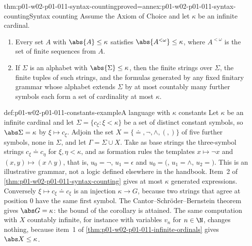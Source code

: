 \begin{hbcorollary}{thm:p01-w02-p01-011-syntax-counting}{proved=annex:p01-w02-p01-011-syntax-counting}{Syntax counting}
Assume the Axiom of Choice and let \(\kappa\) be an infinite cardinal.
\begin{enumerate}
  \item Every set \(A\) with \(\abs{A}\leq\kappa\) satisfies
        \(\abs{A^{<\omega}}\leq\kappa\), where \(A^{<\omega}\) is the set of
        finite sequences from \(A\).
  \item If \(\Sigma\) is an alphabet with \(\abs{\Sigma}\leq\kappa\), then
        the finite strings over \(\Sigma\), the finite tuples of such
        strings, and the formulas generated by any fixed finitary grammar
        whose alphabet extends \(\Sigma\) by at most countably many further
        symbols each form a set of cardinality at most \(\kappa\).
\end{enumerate}
\end{hbcorollary}

\begin{hbexample}{def:p01-w02-p01-011-constants-example}{A language with \(\kappa\) constants}
Let \(\kappa\) be an infinite cardinal and let
\(\Sigma=\{c_\xi:\xi<\kappa\}\) be a set of distinct constant symbols, so
\(\abs\Sigma=\kappa\) by \(\xi\mapsto c_\xi\). Adjoin the set
\(X=\{\doteq,\neg,\wedge,(,)\}\) of five further symbols, none in
\(\Sigma\), and let \(\Gamma=\Sigma\cup X\). Take as base strings the
three-symbol strings \(c_\xi\doteq c_\eta\) for \(\xi,\eta<\kappa\), and as
formation rules the templates \(x\mapsto\neg x\) and
\((x,y)\mapsto(x\wedge y)\), that is, \(u_0=\neg\), \(u_1=\epsilon\) and
\(u_0=(\), \(u_1=\wedge\), \(u_2=)\). This is an illustrative grammar, not a
logic defined elsewhere in the handbook. Item~2 of
\cref{thm:p01-w02-p01-011-syntax-counting} gives at most \(\kappa\)
generated expressions. Conversely \(\xi\mapsto c_\xi\doteq c_\xi\) is an
injection \(\kappa\to G\), because two strings that agree at position
\(0\) have the same first symbol. The Cantor--Schr\"oder--Bernstein theorem
gives \(\abs G=\kappa\): the bound of the corollary is attained. The same
computation with \(X\) countably infinite, for instance with variables
\(v_n\) for \(n\in\N\), changes nothing, because item~1 of
\cref{thm:p01-w02-p01-011-infinite-ordinals} gives \(\abs X\leq\kappa\).
\end{hbexample}

